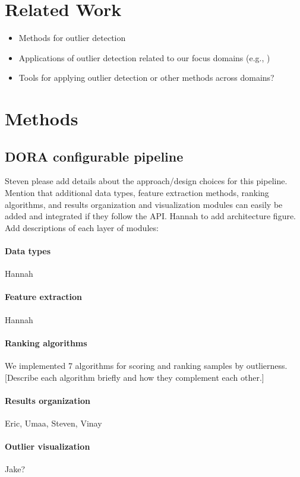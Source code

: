 \documentclass[letterpaper]{article} %
\begin{document}
\section{Related Work}
\begin{itemize}
\item Methods for outlier detection
\item Applications of outlier detection related to our focus domains 
(e.g., \citet{kerner2020comparison})
\item Tools for applying outlier detection or other methods across domains?

\end{itemize}

\section{Methods}

\subsection{DORA configurable pipeline} Steven please add details about the 
approach/design choices for this pipeline. Mention that additional data types, 
feature extraction methods, ranking algorithms, and results organization and 
visualization modules can easily be added and integrated if they follow the API. 
Hannah to add architecture figure. Add descriptions of each layer of modules: 
\paragraph{Data types} Hannah
\paragraph{Feature extraction} Hannah 
\paragraph{Ranking algorithms} We implemented 7 algorithms for scoring and 
ranking samples by outlierness. [Describe each algorithm briefly and how they 
complement each other.]
\paragraph{Results organization} Eric, Umaa, Steven, Vinay
\paragraph{Outlier visualization} Jake?
\end{document}
